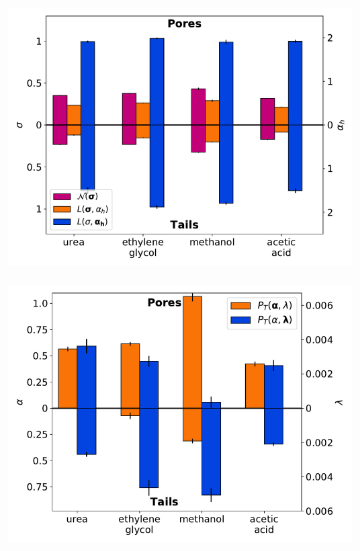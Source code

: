 \documentclass[aps,pre,preprint,groupedaddress]{revtex4-2}
\begin{document}
  \begin{figure}
  \centering
  \begin{subfigure}{0.325\textwidth}
  \includegraphics[width=\textwidth]{2mode_AD_hops.pdf}
  \caption{}\label{fig:2mode_AD_hops}
  \end{subfigure}
  \begin{subfigure}{0.325\textwidth}
  \includegraphics[width=\textwidth]{2mode_AD_dwells.pdf}
  \caption{}\label{fig:2mode_AD_dwells}
  \end{subfigure}
  \begin{subfigure}{0.325\textwidth}

\end{subfigure}
\end{figure}
\end{document}
